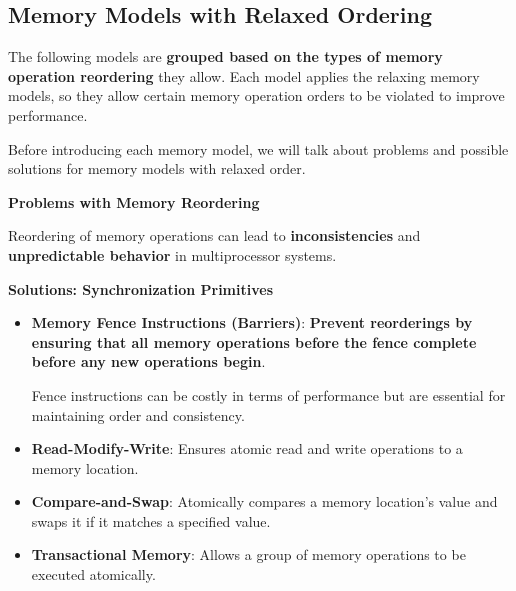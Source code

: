 \subsection{Memory Models with Relaxed Ordering}

The following models are \textbf{grouped based on the types of memory operation reordering} they allow. Each model applies the relaxing memory models, so they allow certain memory operation orders to be violated to improve performance.

\highspace
Before introducing each memory model, we will talk about problems and possible solutions for memory models with relaxed order.

\highspace
\begin{flushleft}
    \textcolor{Red2}{ \textbf{Problems with Memory Reordering}}
\end{flushleft}
Reordering of memory operations can lead to \textbf{inconsistencies} and \textbf{unpredictable behavior} in multiprocessor systems.

\highspace
\begin{flushleft}
    \textcolor{Green3}{ \textbf{Solutions: Synchronization Primitives}}
\end{flushleft}
\begin{itemize}
    \item[\textcolor{Green3}{\faIcon{check}}] \textcolor{Green3}{\textbf{Memory Fence Instructions (Barriers)}}: \textbf{Prevent reorderings by ensuring that all memory operations before the fence complete before any new operations begin}.
    
    Fence instructions can be costly in terms of performance but are essential for maintaining order and consistency.


    \item[\textcolor{Green3}{\faIcon{check}}] \textcolor{Green3}{\textbf{Read-Modify-Write}}: Ensures atomic read and write operations to a memory location.


    \item[\textcolor{Green3}{\faIcon{check}}] \textcolor{Green3}{\textbf{Compare-and-Swap}}: Atomically compares a memory location's value and swaps it if it matches a specified value.


    \item[\textcolor{Green3}{\faIcon{check}}] \textcolor{Green3}{\textbf{Transactional Memory}}: Allows a group of memory operations to be executed atomically.
\end{itemize}

